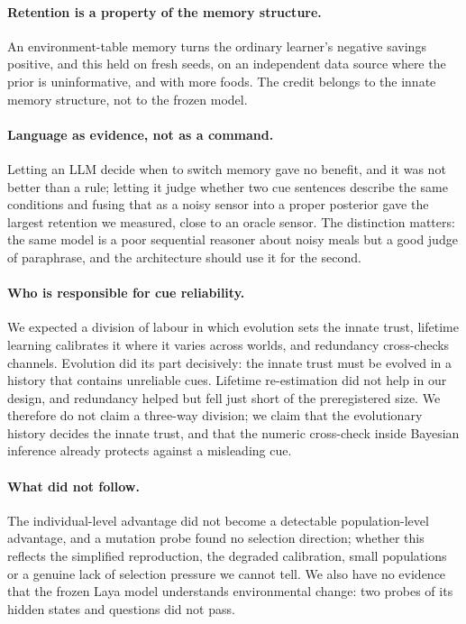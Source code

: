 \documentclass[11pt]{article}
\begin{document}
\paragraph{Retention is a property of the memory structure.} An environment-table memory turns the ordinary learner's negative savings positive, and this held on fresh seeds, on an independent data source where the prior is uninformative, and with more foods. The credit belongs to the innate memory structure, not to the frozen model.

\paragraph{Language as evidence, not as a command.} Letting an LLM decide when to switch memory gave no benefit, and it was not better than a rule; letting it judge whether two cue sentences describe the same conditions and fusing that as a noisy sensor into a proper posterior gave the largest retention we measured, close to an oracle sensor. The distinction matters: the same model is a poor sequential reasoner about noisy meals but a good judge of paraphrase, and the architecture should use it for the second.

\paragraph{Who is responsible for cue reliability.} We expected a division of labour in which evolution sets the innate trust, lifetime learning calibrates it where it varies across worlds, and redundancy cross-checks channels. Evolution did its part decisively: the innate trust must be evolved in a history that contains unreliable cues. Lifetime re-estimation did not help in our design, and redundancy helped but fell just short of the preregistered size. We therefore do not claim a three-way division; we claim that the evolutionary history decides the innate trust, and that the numeric cross-check inside Bayesian inference already protects against a misleading cue.

\paragraph{What did not follow.} The individual-level advantage did not become a detectable population-level advantage, and a mutation probe found no selection direction; whether this reflects the simplified reproduction, the degraded calibration, small populations or a genuine lack of selection pressure we cannot tell. We also have no evidence that the frozen Laya model understands environmental change: two probes of its hidden states and questions did not pass.
\end{document}
